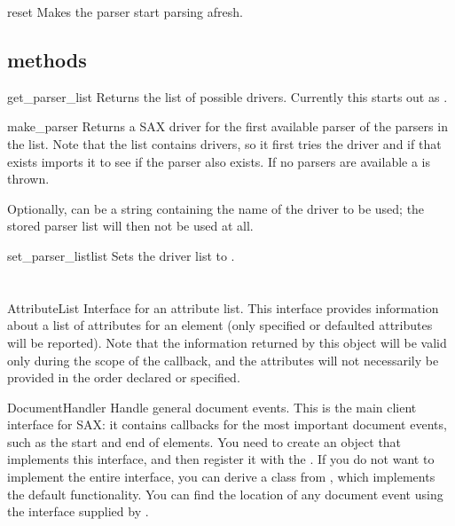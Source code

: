 \documentclass{howto}
\begin{document}
\begin{methoddesc}{reset}{}
Makes the parser start parsing afresh.
\end{methoddesc}

\subsection{ methods}

\begin{methoddesc}{get_parser_list}{}
Returns the list of possible drivers.  Currently this starts out as
.
\end{methoddesc}

\begin{methoddesc}{make_parser}{}
Returns a SAX driver for the first available parser of the parsers
in the list. Note that the list contains drivers, so it first tries
the driver and if that exists imports it to see if the parser also
exists. If no parsers are available a  is thrown.

Optionally,  can be a string containing the name of
the driver to be used; the stored parser list will then not be used at
all.  
\end{methoddesc}

\begin{methoddesc}{set_parser_list}{list}
Sets the driver list to .
\end{methoddesc}


\section{}

\begin{classdesc}{AttributeList}{}
Interface for an attribute list. This interface provides
    information about a list of attributes for an element (only
    specified or defaulted attributes will be reported). Note that the
    information returned by this object will be valid only during the
    scope of the  callback, and the
    attributes will not necessarily be provided in the order declared
    or specified.
\end{classdesc}

\begin{classdesc}{DocumentHandler}{}
Handle general document events. This is the main client
    interface for SAX: it contains callbacks for the most important
    document events, such as the start and end of elements. You need
    to create an object that implements this interface, and then
    register it with the . If you do not want to implement
    the entire interface, you can derive a class from ,
    which implements the default functionality. You can find the
    location of any document event using the  interface
    supplied by .
\end{classdesc}
\end{document}
